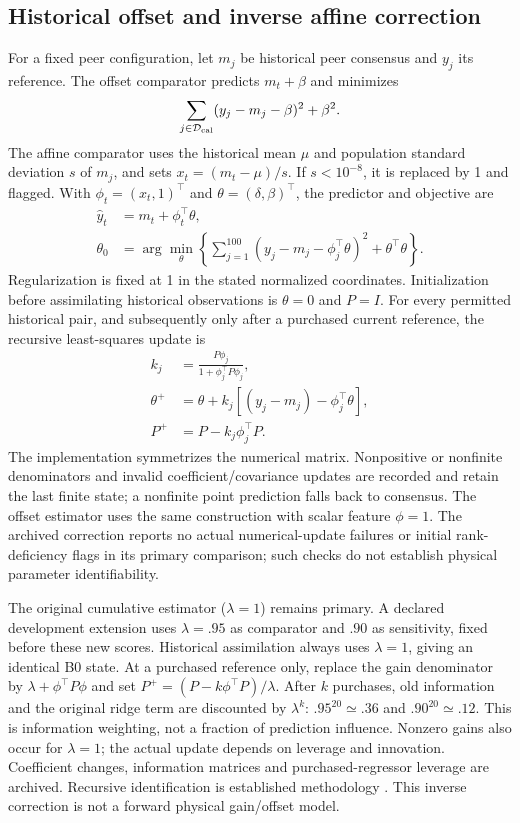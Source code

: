 \subsection{Historical offset and inverse affine correction}\label{sec:affine}
For a fixed peer configuration, let $m_j$ be historical peer consensus and $y_j$ its reference. The offset comparator predicts $m_t+\beta$ and minimizes
\begin{equation}
\sum_{j\in\mathcal D_{\rm cal}}(y_j-m_j-\beta)^2+\beta^2.
\end{equation}
The affine comparator uses the historical mean $\mu$ and population standard deviation $s$ of $m_j$, and sets $x_t=(m_t-\mu)/s$. If $s<10^{-8}$, it is replaced by 1 and flagged. With $\phi_t=(x_t,1)^\top$ and $\theta=(\delta,\beta)^\top$, the predictor and objective are
\begin{align}
\widehat y_t&=m_t+\phi_t^\top\theta,\label{eq:affinepred}\\
\theta_0&=\arg\min_\theta
\left\{\sum_{j=1}^{100}(y_j-m_j-\phi_j^\top\theta)^2+
\theta^\top\theta\right\}.
\label{eq:ridgeobjective}
\end{align}
Regularization is fixed at 1 in the stated normalized coordinates. Initialization before assimilating historical observations is $\theta=0$ and $P=I$. For every permitted historical pair, and subsequently only after a purchased current reference, the recursive least-squares update is
\begin{align}
k_j&=\frac{P\phi_j}{1+\phi_j^\top P\phi_j},\\
\theta^+&=\theta+k_j[(y_j-m_j)-\phi_j^\top\theta],\\
P^+&=P-k_j\phi_j^\top P.
\label{eq:rls}
\end{align}
The implementation symmetrizes the numerical matrix. Nonpositive or nonfinite denominators and invalid coefficient/covariance updates are recorded and retain the last finite state; a nonfinite point prediction falls back to consensus. The offset estimator uses the same construction with scalar feature $\phi=1$. The archived correction reports no actual numerical-update failures or initial rank-deficiency flags in its primary comparison; such checks do not establish physical parameter identifiability.

The original cumulative estimator ($\lambda=1$) remains primary. A declared development extension uses $\lambda=.95$ as comparator and $.90$ as sensitivity, fixed before these new scores. Historical assimilation always uses $\lambda=1$, giving an identical B0 state. At a purchased reference only, replace the gain denominator by $\lambda+\phi^\top P\phi$ and set $P^+=(P-k\phi^\top P)/\lambda$. After $k$ purchases, old information and the original ridge term are discounted by $\lambda^k$: $.95^{20}\simeq.36$ and $.90^{20}\simeq.12$. This is information weighting, not a fraction of prediction influence. Nonzero gains also occur for $\lambda=1$; the actual update depends on leverage and innovation. Coefficient changes, information matrices and purchased-regressor leverage are archived. Recursive identification is established methodology \cite{ljung1983}. This inverse correction is not a forward physical gain/offset model.

